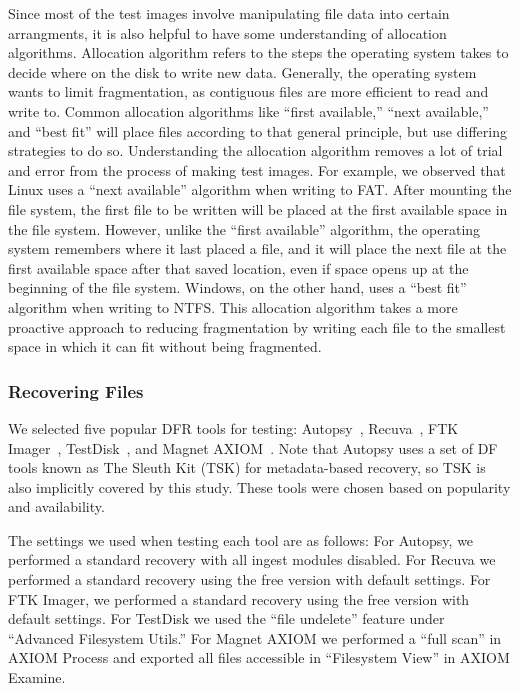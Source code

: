 Since most of the test images involve manipulating file data into certain arrangments, it is also helpful to have some understanding of allocation algorithms.
Allocation algorithm refers to the steps the operating system takes to decide where on the disk to write new data.
Generally, the operating system wants to limit fragmentation, as contiguous files are more efficient to read and write to.
Common allocation algorithms like ``first available,'' ``next available,'' and ``best fit'' will place files according to that general principle, but use differing strategies to do so.
Understanding the allocation algorithm removes a lot of trial and error from the process of making test images.
For example, we observed that Linux uses a ``next available'' algorithm when writing to FAT.
After mounting the file system, the first file to be written will be placed at the first available space in the file system.
However, unlike the ``first available'' algorithm, the operating system remembers where it last placed a file, and it will place the next file at the first available space after that saved location, even if space opens up at the beginning of the file system.
Windows, on the other hand, uses a ``best fit'' algorithm when writing to NTFS.
This allocation algorithm takes a more proactive approach to reducing fragmentation by writing each file to the smallest space in which it can fit without being fragmented.


\subsubsection{Recovering Files}
\begin{paraphrase}
 We selected five popular DFR tools for testing: Autopsy~\cite{autopsy}, Recuva~\cite{recuva}, FTK Imager~\cite{ftk}, TestDisk~\cite{testdisk}, and Magnet AXIOM~\cite{axiom}. 
Note that Autopsy uses a set of DF tools known as The Sleuth Kit (TSK) for metadata-based recovery, so TSK is also implicitly covered by this study. 
These tools were chosen based on popularity and availability.

The settings we used when testing each tool are as follows:
For Autopsy, we performed a standard recovery with all ingest modules disabled.
For Recuva we performed a standard recovery using the free version with default settings.
For FTK Imager, we performed a standard recovery using the free version with default settings.
For TestDisk we used the ``file undelete'' feature under ``Advanced Filesystem Utils.''
For Magnet AXIOM we performed a ``full scan'' in AXIOM Process and exported all files accessible in ``Filesystem View'' in AXIOM Examine.
\end{paraphrase}

